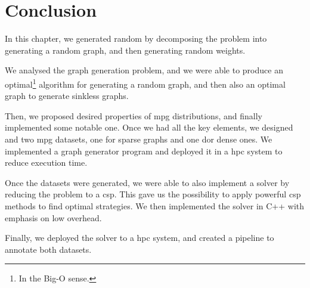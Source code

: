 \section*{Conclusion}
In this chapter, we generated random  by decomposing the problem into generating a random graph, and then generating random weights.

We analysed the graph generation problem, and we were able to produce an optimal\footnote{In the Big-O sense.} algorithm for generating a random graph, and then also an optimal graph to generate sinkless graphs.

Then, we proposed desired properties of \acrshort{mpg} distributions, and finally implemented some notable one. Once we had all the key elements, we designed and two \acrshort{mpg} datasets, one for sparse graphs and one dor dense ones. We implemented a graph generator program and deployed it in a \acrshort{hpc} system to reduce execution time.

Once the datasets were generated, we were able to also implement a solver by reducing the problem to a \acrshort{csp}. This gave us the possibility to apply powerful \acrshort{csp} methods to find optimal strategies. We then implemented the solver in C++ with emphasis on low overhead.

Finally, we deployed the solver to a \acrshort{hpc} system, and created a pipeline to annotate both datasets.